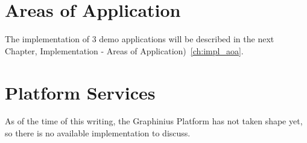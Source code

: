 	
\section{Areas of Application}
\label{sect:aoas}

The implementation of 3 demo applications will be described in the next Chapter, Implementation - Areas of Application)~\ref{ch:impl_aoa}.
	
\section{Platform Services}
\label{sect:platform_services}

As of the time of this writing, the Graphinius Platform has not taken shape yet, so there is no available implementation to discuss.




